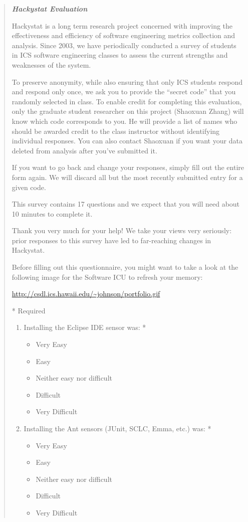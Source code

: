 \documentclass[11pt]{article}
\begin{document}
\begin{quote}
\sl
{\bf \em Hackystat Evaluation}

Hackystat is a long term research project concerned with improving the effectiveness and efficiency of software engineering metrics collection and analysis.  Since 2003, we have periodically conducted a survey of students in ICS software engineering classes to assess the current strengths and weaknesses of the system.

To preserve anonymity,  while also ensuring that only ICS students respond and respond only once, we ask you to provide the ``secret code'' that you randomly selected in class.   To enable credit for completing this evaluation, only the graduate student researcher on this project (Shaoxuan Zhang) will know which code corresponds to you.  He will provide a list of names who should be awarded credit to the class instructor without identifying individual responses.  You can also contact Shaoxuan if you want your data deleted from analysis after you've submitted it.

If you want to go back and change your responses, simply fill out the entire form again.  We will discard all but the most recently submitted entry for a given code.

This survey contains 17 questions and we expect that you will need about 10 minutes to complete it.

Thank you very much for your help!  We take your views very seriously: prior responses to this survey have led to far-reaching changes in Hackystat.

Before filling out this questionnaire, you might want to take a look at the following image for the Software ICU to refresh your memory:

\url{http://csdl.ics.hawaii.edu/~johnson/portfolio.gif}

* Required
\begin{enumerate}

\item Installing the Eclipse IDE sensor was: *
\begin{itemize}
\item Very Easy
\item Easy
\item Neither easy nor difficult
\item Difficult
\item Very Difficult
\end{itemize}

\item Installing the Ant sensors (JUnit, SCLC, Emma, etc.) was: *
\begin{itemize}
\item Very Easy
\item Easy
\item Neither easy nor difficult
\item Difficult
\item Very Difficult
\end{itemize}


\end{enumerate}
\end{quote}
\end{document}
